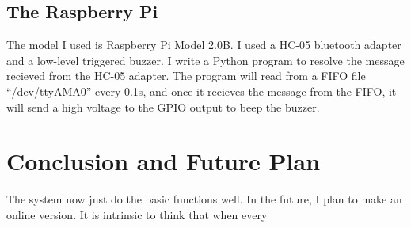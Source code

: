 \documentclass{article}
\begin{document}
\subsection{The Raspberry Pi}
The model I used is Raspberry Pi Model 2.0B. I used a HC-05 bluetooth adapter and a low-level triggered buzzer. I write a Python program to resolve the message recieved from the HC-05 adapter. The program will read from a FIFO file “/dev/ttyAMA0'' every 0.1s, and once it recieves the message from the FIFO, it will send a high voltage to the GPIO output to beep the buzzer. 
\section{Conclusion and Future Plan}
The system now just do the basic functions well. In the future, I plan to make an online version. It is intrinsic to think that when every
\end{document}
